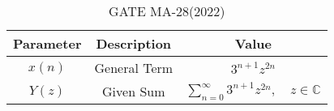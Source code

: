
\begin{table}[h]
  \centering
  \begin{tabular}{|c|c|c|}
    \hline
Parameter & Description & Value \\ \hline
$x(n)$ & General Term & $3^{n+1}z^{2n}$\\
\hline
$Y(z)$ & Given Sum & $\sum_{n=0}^{\infty} 3^{n+1}z^{2n}, \quad z \in \mathbb{C} $\\
\hline
  \end{tabular}
  \vspace{2mm}
  \caption{GATE MA-28(2022)}
\end{table}



